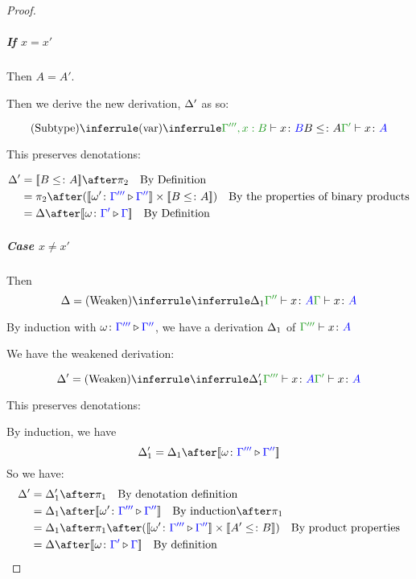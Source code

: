 \documentclass{report}
\begin{document}
\begin{framed}
\begin{proof}
            \subparagraph{If $x = x'$}
        
            Then $A = A'$.
        
            Then we derive the new derivation, $\Delta'$ as so:
        
            \begin{equation}
                \ntreeruleII{Subtype}{
                    \ntreeruleI{var}{}{\typerelation{\G''', x: B}{x}{B}}
                    }{
                    B \subtype A
                }{
                    \typerelation{\G'}{x}{A}
                }
            \end{equation}
        
            This preserves denotations:
        
            \begin{align*}
                \D' & = \deno{B\subtype A}\after\pp\qt{By Definition} \\
                 & = \pp\after (\deno{\wrel{\w'}{\G'''}{\G''}}\times \deno{B\subtype A}) \qt{By the properties of binary products}\\
                 & = \D\after\deno{\wrel{\w}{\G'}{\G}}\qt{By Definition}
            \end{align*}
        
            \subparagraph{Case $x \neq x'$}
            Then 
            \begin{equation}
                \D = \ntreeruleI{Weaken}{\treeruleI{\D_1}{\typerelation{\G''}{x}{A}}}{\gtyperelation{x}{A}}
            \end{equation}
        
            By induction with $\omega \colon {\color{blue}\Gamma'''} \triangleright {\color {blue} \Gamma''}$,
             we have a derivation $\Delta_1$ of $\typerelation{\G'''}{x}{A}$
        
            We have the weakened derivation:
        
            \begin{equation}
                \D' = \ntreeruleI{Weaken}{\treeruleI{\D_1'}{\typerelation{\G'''}{x}{A}}}{\typerelation{\G'}{x}{A}}
            \end{equation}
        
            This preserves denotations:
        
            By induction, we have
            \begin{equation}
                \D_1' = \D_1 \after \deno{\wrel{\w}{\G'''}{\G''}}
            \end{equation}
            So we have:
            \begin{align*}
                \D' &= \D_1' \after \p\qt{By denotation definition}\\
                & = \D_1\after\deno{\wrel{\w'}{\G'''}{\G''}}\qt{By induction}\after\p \\
                & = \D_1\after\p\after(\deno{\wrel{\w'}{\G'''}{\G''}}\times\deno{A' \subtype B})\qt{By product properties}\\
                & = \D\after\deno{\wrel{\w}{\G'}{\G}}\qt{By definition}
            \end{align*}
        

\end{proof}
\end{framed}
\end{document}
